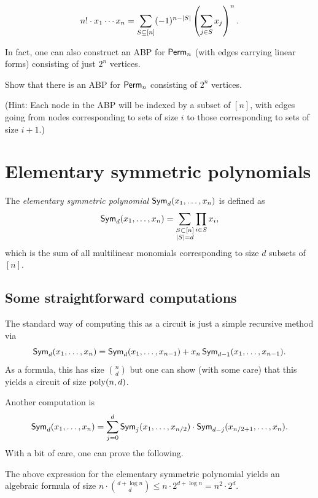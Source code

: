 \begin{lemma}
\[
n! \cdot x_1 \cdots x_n = \sum_{S \subseteq [n]} (-1)^{n - |S|} \left(\sum_{j \in S} x_j\right)^n.
\]
\end{lemma}

In fact, one can also construct an ABP for $\operatorname{\mathsf{Perm}}_n$ (with edges carrying linear forms) consisting of just $2^n$ vertices. 

\begin{exercise}
Show that there is an ABP for $\operatorname{\mathsf{Perm}}_n$ consisting of $2^n$ vertices. 

(Hint: Each node in the ABP will be indexed by a subset of $[n]$, with edges going from nodes corresponding to sets of size $i$ to those corresponding to sets of size $i+1$.)
\end{exercise}

\section{Elementary symmetric polynomials}

The \emph{elementary symmetric polynomial} $\operatorname{\mathsf{Sym}}_d(x_1,\ldots, x_n)$ is defined as 
\[
\operatorname{\mathsf{Sym}}_d(x_1,\ldots, x_n) = \sum_{\substack{S \subset [n]\\|S| = d}} \prod_{i\in S} x_i,
\]
which is the sum of all multilinear monomials corresponding to size $d$ subsets of $[n]$. 

\subsection{Some straightforward computations}

The standard way of computing this as a circuit is just a simple recursive method via 
\[
\operatorname{\mathsf{Sym}}_{d}(x_1,\ldots, x_n) = \operatorname{\mathsf{Sym}}_{d}(x_1,\ldots, x_{n-1}) + x_n \operatorname{\mathsf{Sym}}_{d-1}(x_1,\ldots, x_{n-1}).
\]
As a formula, this has size $\binom{n}{d}$ but one can show (with some care) that this yields a circuit of size $\operatorname{poly}(n,d)$. 


\noindent
Another computation is 
\[
\operatorname{\mathsf{Sym}}_{d}(x_1,\ldots, x_n) = \sum_{j=0}^d \operatorname{\mathsf{Sym}}_{j}(x_1,\ldots, x_{n/2}) \cdot \operatorname{\mathsf{Sym}}_{d-j}(x_{n/2 + 1},\ldots, x_{n}).
\]
With a bit of care, one can prove the following. 

\begin{lemma}
The above expression for the elementary symmetric polynomial yields an algebraic formula of size $n \cdot \binom{d + \log n}{d} \leq n \cdot 2^{d + \log n} = n^2 \cdot 2^d$. 
\end{lemma}

